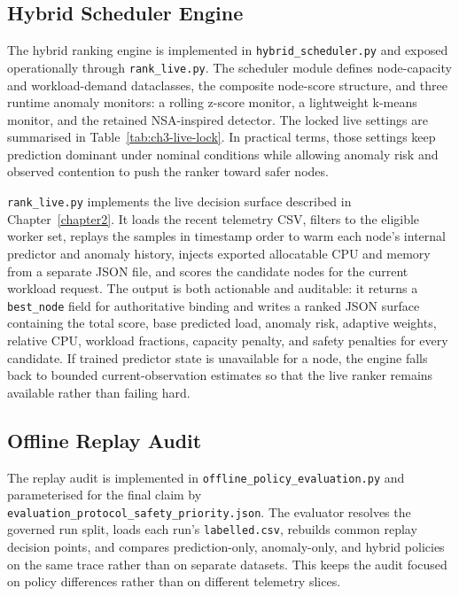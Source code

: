 \subsection{Hybrid Scheduler Engine}

The hybrid ranking engine is implemented in \texttt{hybrid\_scheduler.py} and exposed operationally through \texttt{rank\_live.py}. The scheduler module defines node-capacity and workload-demand dataclasses, the composite node-score structure, and three runtime anomaly monitors: a rolling z-score monitor, a lightweight k-means monitor, and the retained NSA-inspired detector. The locked live settings are summarised in Table~\ref{tab:ch3-live-lock}. In practical terms, those settings keep prediction dominant under nominal conditions while allowing anomaly risk and observed contention to push the ranker toward safer nodes.

\texttt{rank\_live.py} implements the live decision surface described in Chapter~\ref{chapter2}. It loads the recent telemetry CSV, filters to the eligible worker set, replays the samples in timestamp order to warm each node's internal predictor and anomaly history, injects exported allocatable CPU and memory from a separate JSON file, and scores the candidate nodes for the current workload request. The output is both actionable and auditable: it returns a \texttt{best\_node} field for authoritative binding and writes a ranked JSON surface containing the total score, base predicted load, anomaly risk, adaptive weights, relative CPU, workload fractions, capacity penalty, and safety penalties for every candidate. If trained predictor state is unavailable for a node, the engine falls back to bounded current-observation estimates so that the live ranker remains available rather than failing hard.

\subsection{Offline Replay Audit}

The replay audit is implemented in \texttt{offline\_policy\_evaluation.py} and parameterised for the final claim by \texttt{evaluation\_protocol\_safety\_priority.json}. The evaluator resolves the governed run split, loads each run's \texttt{labelled.csv}, rebuilds common replay decision points, and compares prediction-only, anomaly-only, and hybrid policies on the same trace rather than on separate datasets. This keeps the audit focused on policy differences rather than on different telemetry slices.

